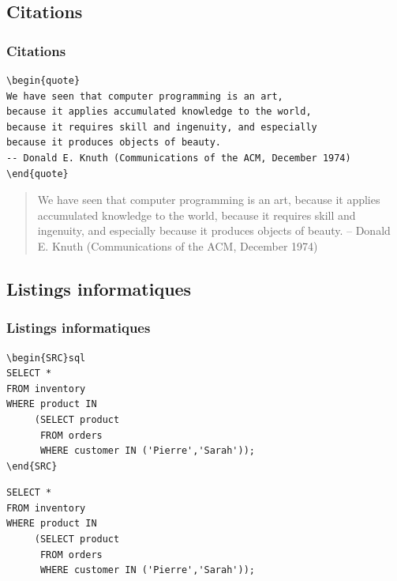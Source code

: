 \documentclass[presentation,t,hideothersubsections]{beamer}
\begin{document}
\subsection{Citations}
\label{sec-3-6}
\begin{frame}[fragile]
\frametitle{Citations}
\label{sec-3-6-1}



\lstset{language=org}
\begin{lstlisting}
\begin{quote}
We have seen that computer programming is an art,
because it applies accumulated knowledge to the world,
because it requires skill and ingenuity, and especially
because it produces objects of beauty.
-- Donald E. Knuth (Communications of the ACM, December 1974)
\end{quote}

\end{lstlisting}

\begin{quote}
We have seen that computer programming is an art,
because it applies accumulated knowledge to the world,
because it requires skill and ingenuity, and especially
because it produces objects of beauty.
-- Donald E. Knuth (Communications of the ACM, December 1974)
\end{quote}
\end{frame}
\subsection{Listings informatiques}
\label{sec-3-7}
\begin{frame}[fragile]
\frametitle{Listings informatiques}
\label{sec-3-7-1}



\lstset{language=org}
\begin{lstlisting}
\begin{SRC}sql
SELECT *
FROM inventory
WHERE product IN
     (SELECT product
      FROM orders
      WHERE customer IN ('Pierre','Sarah'));
\end{SRC}
\end{lstlisting}


\lstset{language=SQL}
\begin{lstlisting}
SELECT *
FROM inventory
WHERE product IN
     (SELECT product
      FROM orders
      WHERE customer IN ('Pierre','Sarah'));
\end{lstlisting}
\end{frame}
\end{document}
